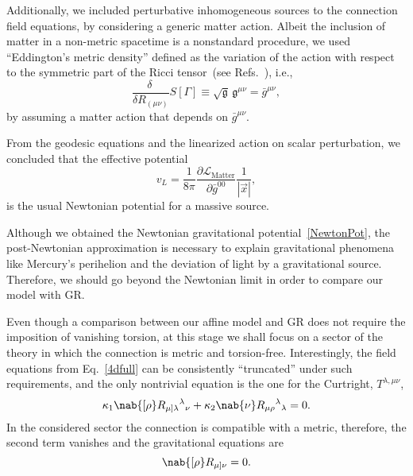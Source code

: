 \documentclass[aps,prl,twocolumn,superscriptaddress,showpacs,showkeys]{revtex4-1}
\begin{document}
Additionally, we included perturbative inhomogeneous sources to the connection field equations, by considering a generic matter action. Albeit the inclusion of matter in a non-metric spacetime is a nonstandard procedure, we used ``Eddington's metric density''%
defined as the variation of the action with respect to the symmetric part of the Ricci tensor~(see Refs.~\cite{Eddington1923math,schrodinger1950space,Poplawski:2012bw}), i.e.,%
\begin{equation}
  \label{metric}
  \frac{\delta\ }{\delta R_{(\mu\nu)}} S[\Gamma] \equiv \sqrt{\mathfrak{g}} \, \mathfrak{g}^{\mu\nu} = \bar{g}^{\mu\nu} ,
\end{equation}
by assuming a matter action that depends on $\bar{g}^{\mu\nu}$.

From the geodesic equations and the linearized action on scalar perturbation, we concluded that the effective potential
\begin{equation}
  \label{NewtonPot}
  v_L = \frac{1}{8\pi} \frac{ \partial\mathcal{L}_{\text{Matter}} }{ \partial \bar{g}^{00} } \frac{1}{|\vec{x}|},
\end{equation}
is the usual Newtonian potential for a massive source.

Although we obtained the Newtonian gravitational potential~\eqref{NewtonPot}, the post-Newtonian approximation is necessary to explain gravitational phenomena like Mercury's perihelion and the deviation of light by a gravitational source. Therefore, we should go beyond the Newtonian limit in order to compare our model with GR.

Even though a comparison between our affine model and GR does not require the imposition of vanishing torsion, at this stage we shall focus on a sector of the theory in which the connection is metric and torsion-free. Interestingly, the field equations from Eq.~\eqref{4dfull} can be consistently ``truncated'' under such requirements, and the only nontrivial equation is the one for the Curtright, $T^{\lambda,\mu\nu}$,
\begin{equation*}
  \kappa_1 \nab{[\rho} R_{\mu]\lambda}{}^{\lambda}{}_{\nu} + \kappa_2 \nab{\nu} R_{\mu\rho}{}^\lambda{}_\lambda = 0.
\end{equation*}
In the considered sector the connection is compatible with a metric, therefore, the second term vanishes and the gravitational equations are
\begin{equation}
  \nab{[\rho} R_{\mu]\nu} = 0.
  \label{SimpleEOM}
\end{equation}
\end{document}
